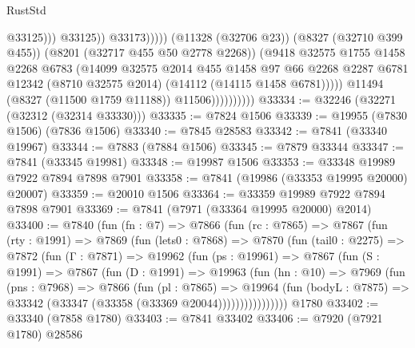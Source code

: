 \begin{lexlean}{RustStd}
\begin{coremodule}
                                              @33125)))
                                        @33125))
                                    @33173)))))
                          (@11328 (@32706 @23))
                          (@8327 (@32710 @399 @455))
                          (@8201 (@32717 @455 @50 @2778 @2268))
                          (@9418
                            @32575
                            @1755
                            @1458
                            @2268
                            @6783
                            (@14099
                              @32575
                              @2014
                              @455
                              @1458
                              @97
                              @66
                              @2268
                              @2287
                              @6781
                              @12342
                              (@8710 @32575 @2014)
                              (@14112 (@14115 @1458 @6781)))))
                        @11494
                        (@8327 (@11500 @1759 @11188))
                        @11506))))))))))
@33334 := @32246 (@32271 (@32312 (@32314 @33330)))
@33335 := @7824 @1506
@33339 := @19955 (@7830 @1506) (@7836 @1506)
@33340 := @7845 @28583
@33342 := @7841 (@33340 @19967)
@33344 := @7883 (@7884 @1506)
@33345 := @7879 @33344
@33347 := @7841 (@33345 @19981)
@33348 := @19987 @1506
@33353 := @33348 @19989 @7922 @7894 @7898 @7901
@33358 := @7841 (@19986 (@33353 @19995 @20000) @20007)
@33359 := @20010 @1506
@33364 := @33359 @19989 @7922 @7894 @7898 @7901
@33369 := @7841 (@7971 (@33364 @19995 @20000) @2014)
@33400 := @7840
    (fun (fn : @7) =>
    @7866
      (fun (rc : @7865) =>
      @7867
        (fun (rty : @1991) =>
        @7869
          (fun (lets0 : @7868) =>
          @7870
            (fun (tail0 : @2275) =>
            @7872
              (fun (Γ : @7871) =>
              @19962
                (fun (ps : @19961) =>
                @7867
                  (fun (S : @1991) =>
                  @7867
                    (fun (D : @1991) =>
                    @19963
                      (fun (hn : @10) =>
                      @7969
                        (fun (pns : @7968) =>
                        @7866
                          (fun (pl : @7865) =>
                          @19964
                            (fun (bodyL : @7875) =>
                            @33342 (@33347 (@33358 (@33369 @20044))))))))))))))))
    @1780
@33402 := @33340 (@7858 @1780)
@33403 := @7841 @33402
@33406 := @7920 (@7921 @1780) @28586

\end{coremodule}
\end{lexlean}

